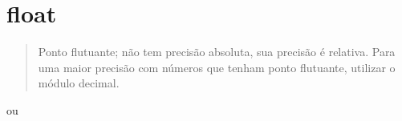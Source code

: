 \documentclass[letterpaper,10pt,brazil]{sphinxmanual}
\begin{document}
\begin{sphinxVerbatim}[commandchars=\\\{\}]
\end{sphinxVerbatim}

\begin{sphinxVerbatim}[commandchars=\\\{\}]
 
\end{sphinxVerbatim}

\begin{sphinxVerbatim}[commandchars=\\\{\}]
\end{sphinxVerbatim}

\begin{sphinxVerbatim}[commandchars=\\\{\}]
 
\end{sphinxVerbatim}

\begin{sphinxVerbatim}[commandchars=\\\{\}]
\end{sphinxVerbatim}


\section{float}
\label{\detokenize{content/numeric_data_types:float}}\begin{quote}

Ponto flutuante; não tem precisão absoluta, sua precisão é relativa.
Para uma maior precisão com números que tenham ponto flutuante, utilizar o módulo decimal.
\end{quote}

\begin{sphinxVerbatim}[commandchars=\\\{\}]
  
\end{sphinxVerbatim}

ou

\begin{sphinxVerbatim}[commandchars=\\\{\}]
  
\end{sphinxVerbatim}
\end{document}
